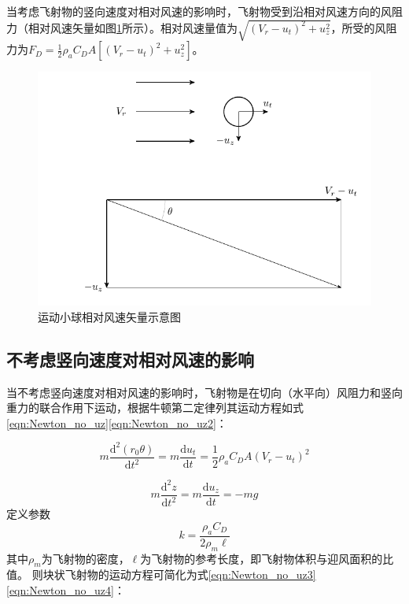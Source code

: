 \documentclass{ctexart}
\begin{document}
当考虑飞射物的竖向速度对相对风速的影响时，飞射物受到沿相对风速方向的风阻力（相对风速矢量如图\ref{fig:relative_velocity}所示）。相对风速量值为$\sqrt{(V_r-u_t)^2+u_z^2}$，所受的风阻力为$F_D=\frac{1}{2} \rho_a C_D A \left[(V_r-u_t)^2+u_z^2\right] $。

\begin{figure}[h]
\centering
\includegraphics{./fig/relative_velocity}
\caption{运动小球相对风速矢量示意图}
\label{fig:relative_velocity}
\end{figure}

\subsection{不考虑竖向速度对相对风速的影响}
当不考虑竖向速度对相对风速的影响时，飞射物是在切向（水平向）风阻力和竖向重力的联合作用下运动，根据牛顿第二定律列其运动方程如式\eqref{eqn:Newton_no_uz}\eqref{eqn:Newton_no_uz2}：

\begin{equation}
  \label{eqn:Newton_no_uz}
      m\frac{\mathrm{d}^2 \left(r_0 \theta \right)}{\mathrm{d} t^2} = m\frac{\mathrm{d} u_t}{\mathrm{d} t} = \frac{1}{2} \rho_a C_D A \left(V_r-u_t\right)^2
\end{equation}

\begin{equation}
  \label{eqn:Newton_no_uz2}
  m\frac{\mathrm{d}^2 z}{\mathrm{d} t^2} = m\frac{\mathrm{d} u_z}{\mathrm{d} t } = -mg
\end{equation}
定义参数
\begin{equation}
k=\frac{\rho_a C_D}{2 \rho_m \ell}
\end{equation}
其中$\rho_m$为飞射物的密度，$\ell$为飞射物的参考长度，即飞射物体积与迎风面积的比值。
则块状飞射物的运动方程可简化为式\eqref{eqn:Newton_no_uz3}\eqref{eqn:Newton_no_uz4}：
\end{document}
